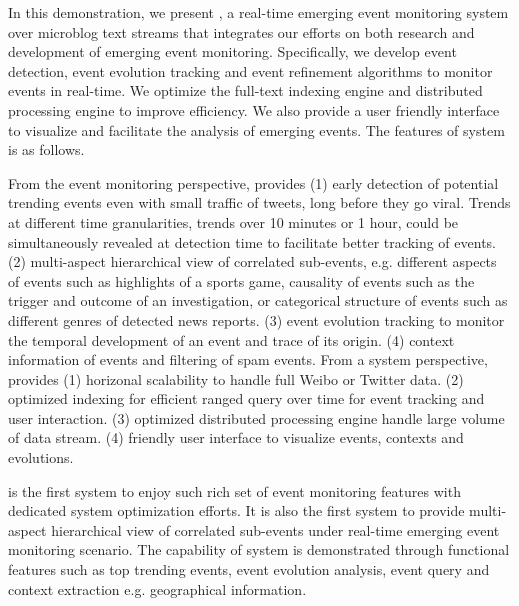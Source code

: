 In this demonstration, we present \ring, a real-time emerging event monitoring system over microblog text streams that integrates our efforts on both research and development of emerging event monitoring.
Specifically, we develop event detection, event evolution tracking and event refinement algorithms to monitor events in real-time.
We optimize the full-text indexing engine and distributed processing engine to improve efficiency.
We also provide a user friendly interface to visualize and facilitate the analysis of emerging events.
The features of \ring system is as follows.

From the event monitoring perspective, \ring provides
(1) early detection of potential trending events even with small traffic of tweets, long before they go viral. Trends at different time granularities, \ie trends over 10 minutes or 1 hour, could be simultaneously revealed at detection time to facilitate better tracking of events.
(2) multi-aspect hierarchical view of correlated sub-events, e.g. different aspects of events such as highlights of a sports game, causality of events such as the trigger and outcome of an investigation, or categorical structure of events such as different genres of detected news reports.
(3) event evolution tracking to monitor the temporal development of an event and trace of its origin.
(4) context information of events and filtering of spam events.
From a system perspective, \ring provides
(1) horizonal scalability to handle full Weibo or Twitter data.
(2) optimized indexing for efficient ranged query over time for event tracking and user interaction.
(3) optimized distributed processing engine handle large volume of data stream.
(4) friendly user interface to visualize events, contexts and evolutions.

\ring is the first system to enjoy such rich set of event monitoring features with dedicated system optimization efforts.
It is also the first system to provide multi-aspect hierarchical view of correlated sub-events under real-time emerging event monitoring scenario.
The capability of \ring system is demonstrated through functional features such as top trending events, event evolution analysis, event query and context extraction e.g. geographical information.

